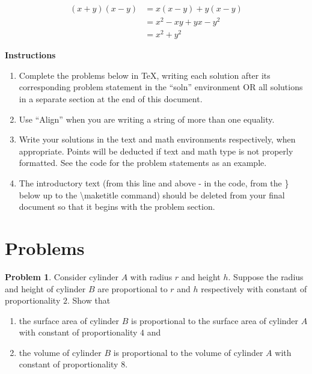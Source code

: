 \documentclass[11pt]{article} %
\theoremstyle{plain}%
\theoremstyle{definition}
\newtheorem{prob}{Problem}
\begin{document}

\begin{align*} 
(x + y)(x - y) &= x(x - y) + y(x - y)\\
 &= x^2 -xy + yx - y^2 \\
 &=x^2 + y^2
\end{align*}


{\color{red}
\textbf{Instructions}
	\begin{enumerate}
		\item Complete the problems below in \TeX, writing each solution after its corresponding problem statement in the ``soln'' environment OR all solutions in a separate section at the end of this document. 
		\item Use ``Align'' when you are writing a string of more than one equality. 
		\item Write your solutions in the text and math environments respectively, when appropriate. Points will be deducted if text and math type is not properly formatted. See the code for the problem statements as an example.
		\item The introductory text (from this line and above - in the code, from the \} below up to the \textbackslash maketitle command) should be deleted from your final document so that it begins with the problem section.
\end{enumerate}
}

\section*{Problems}



\begin{prob}
Consider cylinder $A$ with radius $r$ and height $h$. Suppose the radius and height of cylinder $B$ are proportional to $r$ and $h$ respectively with constant of proportionality $2$. Show that
\begin{enumerate}[leftmargin=.5cm,itemindent=.5cm,labelwidth=\itemindent,labelsep=0cm,align=left,label=\alph*),ref=\alph*]
	\item the surface area of cylinder $B$ is proportional to the surface area of cylinder $A$ with constant of proportionality $4$ and
	\item the volume of cylinder $B$ is proportional to the volume of cylinder $A$ with constant of proportionality $8$.
\end{enumerate}
\end{prob}
\end{document}
